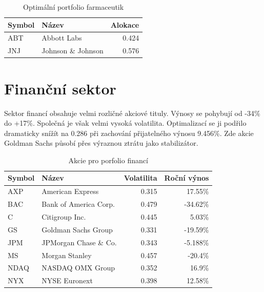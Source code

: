 \documentclass[a4paper,12pt]{report}
\begin{document}
    \begin{table}[htb]
      \centering
      \begin{tabular}{|l|l|r|}
        \hline
        Symbol&Název&Alokace\\\hline\hline
        ABT&Abbott Labs &0.424\\\hline
        JNJ&Johnson \& Johnson &0.576\\\hline
      \end{tabular}
      \caption{Optimální portfolio farmaceutik}
    \end{table}
    
  \clearpage
  \section{Finanční sektor}
    Sektor financí obsahuje velmi rozličné akciové tituly. Výnosy se pohybují od -34\% do +17\%. Společná je však velmi vysoká volatilita. Optimalizací se ji podřilo dramaticky snížít na 0.286 při zachování přijatelného výnosu 9.456\%. Zde akcie Goldman Sachs působí přes výraznou ztrátu jako stabilizátor.
    
    \begin{table}[htb]
      \centering
      \begin{tabular}{|l|l|r|r|}
        \hline
        Symbol&Název&Volatilita&Roční výnos\\\hline\hline
        AXP&American Express &0.315&17.55\%\\\hline
        BAC&Bank of America Corp. &0.479&-34.62\%\\\hline
        C&Citigroup Inc. &0.445&5.03\%\\\hline
        GS&Goldman Sachs Group &0.331&-19.59\%\\\hline
        JPM&JPMorgan Chase \& Co. &0.343&-5.188\%\\\hline
        MS&Morgan Stanley &0.457&-20.4\%\\\hline
        NDAQ&NASDAQ OMX Group &0.352&16.9\%\\\hline
        NYX&NYSE Euronext &0.398&12.58\%\\\hline
      \end{tabular}
      \caption{Akcie pro porfolio financí}
    \end{table}
\end{document}
